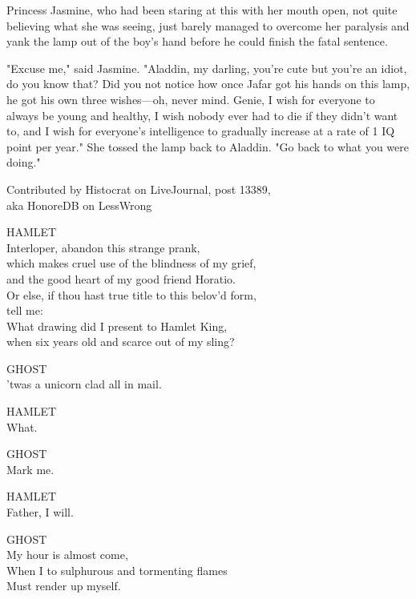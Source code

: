 Princess Jasmine, who had been staring at this with her mouth open, not quite
believing what she was seeing, just barely managed to overcome her paralysis
and yank the lamp out of the boy's hand before he could finish the fatal
sentence.

"Excuse me," said Jasmine. "Aladdin, my darling, you're cute but you're an
idiot, do you know that? Did you not notice how once Jafar got his hands on
this lamp, he got his own three wishes---oh, never mind. Genie, I wish for
everyone to always be young and healthy, I wish nobody ever had to die if they
didn't want to, and I wish for everyone's intelligence to gradually increase at
a rate of 1 IQ point per year." She tossed the lamp back to Aladdin. "Go back
to what you were doing."
\sbreak
\newpage
{}
\begin{center}
    \small
    Contributed by Histocrat on LiveJournal, post 13389,\\ aka HonoreDB on LessWrong
\end{center}

\noindent{}HAMLET\\
Interloper, abandon this strange prank,\\
which makes cruel use of the blindness of my grief,\\
and the good heart of my good friend Horatio.\\
Or else, if thou hast true title to this belov'd form,\\
tell me:\\
What drawing did I present to Hamlet King,\\
when six years old and scarce out of my sling?

\bigskip
\noindent{}GHOST\\
'twas a unicorn clad all in mail.

\bigskip
\noindent{}HAMLET\\
What.

\bigskip
\noindent{}GHOST\\
Mark me.

\bigskip
\noindent{}HAMLET\\
Father, I will.

\bigskip
\noindent{}GHOST\\
My hour is almost come,\\
When I to sulphurous and tormenting flames\\
Must render up myself.

